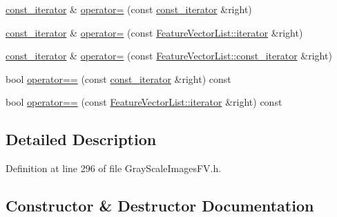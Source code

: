 \begin{DoxyCompactItemize}
\item 
\hyperlink{class_k_k_m_l_l_1_1_gray_scale_images_f_v_list_1_1const__iterator}{const\+\_\+iterator} \& \hyperlink{class_k_k_m_l_l_1_1_gray_scale_images_f_v_list_1_1const__iterator_a3c16333aa202f57a983c220dbfdcda2c}{operator=} (const \hyperlink{class_k_k_m_l_l_1_1_gray_scale_images_f_v_list_1_1const__iterator}{const\+\_\+iterator} \&right)
\item 
\hyperlink{class_k_k_m_l_l_1_1_gray_scale_images_f_v_list_1_1const__iterator}{const\+\_\+iterator} \& \hyperlink{class_k_k_m_l_l_1_1_gray_scale_images_f_v_list_1_1const__iterator_ab66d0cc9458bd0b920415093b704f8d4}{operator=} (const \hyperlink{class_k_k_b_1_1_k_k_queue_aa3c2796a726eea468b94132a9fbf2cfe}{Feature\+Vector\+List\+::iterator} \&right)
\item 
\hyperlink{class_k_k_m_l_l_1_1_gray_scale_images_f_v_list_1_1const__iterator}{const\+\_\+iterator} \& \hyperlink{class_k_k_m_l_l_1_1_gray_scale_images_f_v_list_1_1const__iterator_afa2730581d3e7d4e9a1dde4c7e1ee8b0}{operator=} (const \hyperlink{class_k_k_b_1_1_k_k_queue_aeb057c9c010446f46f57c1e355f981f1}{Feature\+Vector\+List\+::const\+\_\+iterator} \&right)
\item 
bool \hyperlink{class_k_k_m_l_l_1_1_gray_scale_images_f_v_list_1_1const__iterator_a0038445fbadd257bc45d26176c2bdb45}{operator==} (const \hyperlink{class_k_k_m_l_l_1_1_gray_scale_images_f_v_list_1_1const__iterator}{const\+\_\+iterator} \&right) const 
\item 
bool \hyperlink{class_k_k_m_l_l_1_1_gray_scale_images_f_v_list_1_1const__iterator_a5859413ed3196370aa3b9cc1f249a707}{operator==} (const \hyperlink{class_k_k_b_1_1_k_k_queue_aa3c2796a726eea468b94132a9fbf2cfe}{Feature\+Vector\+List\+::iterator} \&right) const 
\end{DoxyCompactItemize}


\subsection{Detailed Description}


Definition at line 296 of file Gray\+Scale\+Images\+F\+V.\+h.



\subsection{Constructor \& Destructor Documentation}
